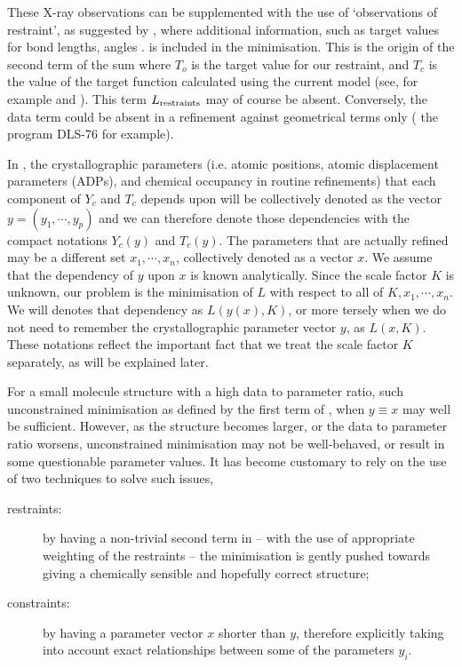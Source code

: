 \documentclass[pdf]{iucr}
\begin{document}
These X-ray observations can be supplemented with the use of `observations of restraint', as suggested by , where additional information, such as target values for bond lengths, angles . is included in the minimisation. This is the origin of the second term of the sum where $T_o$ is the target value for our restraint, and $T_c$ is the value of the target function calculated using the current model (see, for example  and ). This term $L_{\text{restraints}}$ may of course be absent. Conversely, the data term could be absent in a refinement against geometrical terms only ( the program DLS-76  for example).

In , the crystallographic parameters (i.e. atomic positions, atomic displacement parameters (ADPs), and chemical occupancy in routine refinements) that each component of $Y_c$ and $T_c$ depends upon will be collectively denoted as the vector $y=(y_1, \cdots, y_p)$ and we can therefore denote those dependencies with the compact notations $Y_c(y)$ and $T_c(y)$. The parameters that are actually refined may be a different set $x_1, \cdots, x_n$, collectively denoted as a vector $x$. We assume that the dependency of $y$ upon $x$ is known analytically. Since the scale factor $K$ is unknown, our problem is the minimisation of $L$ with respect to all of $K, x_1, \cdots, x_n$. We will  denotes that dependency as $L(y(x), K)$, or more tersely when we do not need to remember the crystallographic parameter vector $y$, as $L(x, K)$. These notations reflect the important fact that we treat the scale factor $K$ separately, as will be explained later.

For a small molecule structure with a high data to parameter ratio, such unconstrained minimisation as defined by the first term of , when $y \equiv x$ may well be sufficient. However, as the structure becomes larger, or the data to parameter ratio worsens, unconstrained minimisation may not be well-behaved, or result in some questionable parameter values. It has become customary to rely on the use of two techniques to solve such issues,
\begin{description}
\item[restraints:] by having a non-trivial second term in  -- with the use of appropriate weighting of the restraints -- the minimisation is gently pushed towards giving a chemically sensible and hopefully correct structure;
\item[constraints:] by having a parameter vector $x$ shorter than $y$, therefore explicitly taking into account exact relationships between some of the parameters $y_i$.
\end{description}
\end{document}
